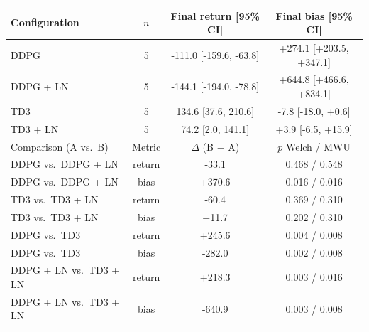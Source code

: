 \begin{tabular}{lccc}
\toprule
Configuration & $n$ & Final return [95\% CI] & Final bias [95\% CI] \\
\midrule
DDPG & 5 & -111.0 [-159.6, -63.8] & +274.1 [+203.5, +347.1] \\
DDPG + LN & 5 & -144.1 [-194.0, -78.8] & +644.8 [+466.6, +834.1] \\
TD3 & 5 & 134.6 [37.6, 210.6] & -7.8 [-18.0, +0.6] \\
TD3 + LN & 5 & 74.2 [2.0, 141.1] & +3.9 [-6.5, +15.9] \\
\midrule
Comparison (A vs.\ B) & Metric & $\Delta$ (B $-$ A) & $p$ Welch / MWU \\
\midrule
DDPG vs.\ DDPG + LN & return & -33.1 & 0.468 / 0.548 \\
DDPG vs.\ DDPG + LN & bias & +370.6 & 0.016 / 0.016 \\
TD3 vs.\ TD3 + LN & return & -60.4 & 0.369 / 0.310 \\
TD3 vs.\ TD3 + LN & bias & +11.7 & 0.202 / 0.310 \\
DDPG vs.\ TD3 & return & +245.6 & 0.004 / 0.008 \\
DDPG vs.\ TD3 & bias & -282.0 & 0.002 / 0.008 \\
DDPG + LN vs.\ TD3 + LN & return & +218.3 & 0.003 / 0.016 \\
DDPG + LN vs.\ TD3 + LN & bias & -640.9 & 0.003 / 0.008 \\
\bottomrule
\end{tabular}
